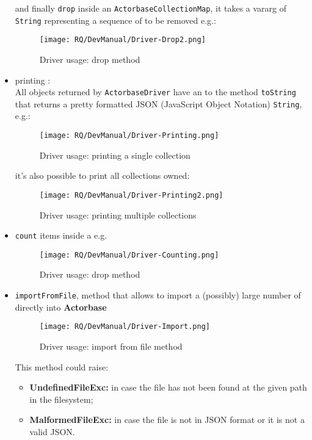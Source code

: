 \documentclass{scalatekids-article}
\begin{document}
\begin{itemize}
\begin{figure}[H]
\begin{center}
    \end{center}
  \end{figure}
  and finally \verb=drop= inside an \verb=ActorbaseCollectionMap=, it takes a
  vararg of \verb=String= representing a sequence of  to be removed
  e.g.:
  \begin{figure}[H]
    \begin{center}
      \texttt{[image: RQ/DevManual/Driver-Drop2.png]}
      \caption{Driver usage: drop method}
    \end{center}
  \end{figure}
\item printing :\\All objects returned by \verb=ActorbaseDriver=
  have an  to the method \verb=toString=
  that returns a pretty formatted JSON (JavaScript Object Notation) \verb=String=, e.g.:
  \begin{figure}[H]
    \begin{center}
      \texttt{[image: RQ/DevManual/Driver-Printing.png]}
      \caption{Driver usage: printing a single collection}
    \end{center}
  \end{figure}
  it's also possible to print all collections owned:
  \begin{figure}[H]
    \begin{center}
      \texttt{[image: RQ/DevManual/Driver-Printing2.png]}
      \caption{Driver usage: printing multiple collections}
    \end{center}
  \end{figure}
\item \verb=count= items inside a  e.g.
  \begin{figure}[H]
    \begin{center}
      \texttt{[image: RQ/DevManual/Driver-Counting.png]}
      \caption{Driver usage: drop method}
    \end{center}
  \end{figure}
\item \verb=importFromFile=, method that allows to import a (possibly) large number of 
  directly into \textbf{Actorbase}
  \begin{figure}[H]
    \begin{center}
      \texttt{[image: RQ/DevManual/Driver-Import.png]}
      \caption{Driver usage: import from file method}
    \end{center}
  \end{figure}
  This method could raise:
  \begin{itemize}
  \item \textbf{UndefinedFileExc:} in case the file has not been found at the given path in the filesystem;
  \item \textbf{MalformedFileExc:} in case the file is not in JSON format or it is not a valid JSON.
  \end{itemize}


\end{itemize}
\end{document}
